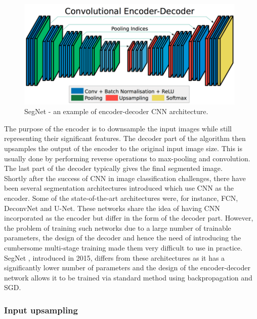 \vspace{4mm}
\begin{figure}[h]
	\begin{center}
		\includegraphics*[width=11cm, keepaspectratio]{obr/segnet.png}
	\end{center}
	\vspace{4mm}
	\caption{SegNet - an example of encoder-decoder CNN architecture. \cite{segnet}} 
	\label{encoder}
\end{figure}

The purpose of the encoder is to downsample the input images while still representing their significant features. The decoder part of the algorithm then upsamples the output of the encoder to the original input image size. This is usually done by performing reverse operations to max-pooling and convolution. The last part of the decoder typically gives the final segmented image. \\

Shortly after the success of CNN in image classification challenges, there have been several segmentation architectures introduced which use CNN as the encoder. Some of the state-of-the-art architectures were, for instance, FCN, DeconvNet and U-Net. These networks share the idea of having CNN incorporated as the encoder but differ in the form of the decoder part. However, the problem of training such networks due to a large number of trainable parameters, the design of the decoder and hence the need of introducing the cumbersome multi-stage training made them very difficult to use in practice. SegNet \cite{segnet}, introduced in 2015, differs from these architectures as it has a significantly lower number of parameters and the design of the encoder-decoder network allows it to be trained via standard method using backpropagation and SGD.  \cite{segnet}

\subsubsection{Input upsampling}


